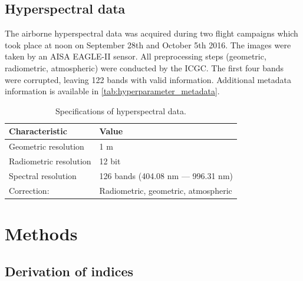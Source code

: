 \documentclass[peerreview]{IEEEtran}
\begin{document}

\subsection{Hyperspectral data}

The airborne hyperspectral data was acquired during two flight campaigns which took place at noon on September 28th and October 5th 2016.
The images were taken by an AISA EAGLE-II sensor.
All preprocessing steps (geometric, radiometric, atmospheric) were conducted by the \ac{ICGC}.
The first four bands were corrupted, leaving 122 bands with valid information.
Additional metadata information is available in \autoref{tab:hyperparameter_metadata}.


\begin{table}[t]
	\centering
	\caption[t]{Specifications of hyperspectral data.}
	\begingroup
	\begin{tabular}{ll}
		\\
		Characteristic         & Value                               \\
		\toprule
		Geometric resolution   & 1 m                                 \\
		Radiometric resolution & 12 bit                              \\
		Spectral resolution    & 126 bands (404.08 nm --- 996.31 nm) \\
		Correction:            & Radiometric, geometric, atmospheric
	\end{tabular}
	\endgroup\label{tab:hyperparameter_metadata}
\end{table}

\section{Methods}

\subsection{Derivation of indices}
\end{document}
